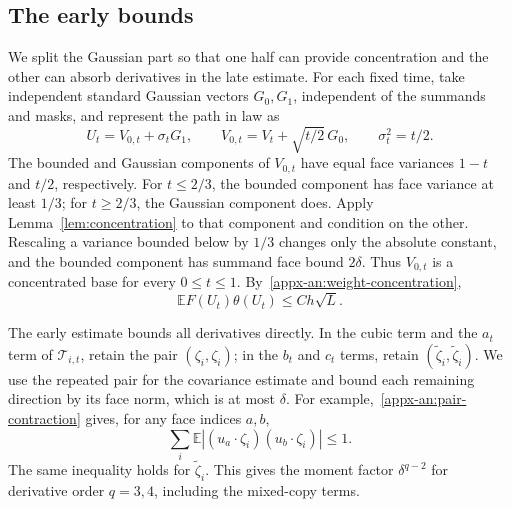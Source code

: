 \documentclass[11pt,letterpaper]{article}
\theoremstyle{remark}
\newcommand{\E}{\mathbb E}
\begin{document}
\subsection{The early bounds}
\label{appx-an:sec:early}

We split the Gaussian part so that one half can provide concentration
and the other can absorb derivatives in the late estimate. For each
fixed time, take independent standard Gaussian vectors \(G_0,G_1\),
independent of the summands and masks, and represent the path in law as
\begin{equation}
 U_t=V_{0,t}+\sigma_t G_1,\qquad
 V_{0,t}=V_t+\sqrt{t/2}\,G_0,\qquad
 \sigma_t^2=t/2.
 \label{appx-an:gaussian-split}
\end{equation}
The bounded and Gaussian components of \(V_{0,t}\) have equal face variances \(1-t\) and
\(t/2\), respectively. For \(t\le2/3\), the bounded component
has face variance at least \(1/3\); for \(t\ge2/3\), the Gaussian
component does. Apply Lemma~\ref{lem:concentration} to that component
and condition on the other. Rescaling a variance bounded below by
\(1/3\) changes only the absolute constant, and the bounded component
has summand face bound \(2\delta\). Thus \(V_{0,t}\) is a concentrated
base for every \(0\le t\le1\).
By~\eqref{appx-an:weight-concentration},
\begin{equation}
 \E F(U_t)\theta(U_t)\le Ch\sqrt L.
 \label{appx-an:path-weight}
\end{equation}

The early estimate bounds all derivatives directly. In the cubic
term and the \(a_t\) term of \(\mathcal T_{i,t}\), retain the pair
\((\zeta_i,\zeta_i)\); in the \(b_t\) and \(c_t\) terms, retain
\((\widetilde\zeta_i,\widetilde\zeta_i)\). We use the repeated pair for the covariance estimate and bound each
remaining direction by its face norm, which is at most \(\delta\).
For example,~\eqref{appx-an:pair-contraction}
gives, for any face indices \(a,b\),
\[
 \sum_i\E|(u_a\cdot\zeta_i)(u_b\cdot\zeta_i)|\le1.
\]
The same inequality holds for \(\widetilde\zeta_i\). This gives the
moment factor \(\delta^{q-2}\) for derivative order \(q=3,4\),
including the mixed-copy terms.
\end{document}

